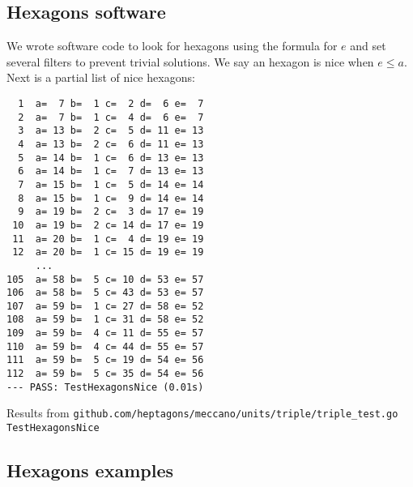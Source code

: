 \documentclass[11pt]{article}
\begin{document}
\subsection{Hexagons software}
We wrote software code to look for hexagons using the formula for $e$ and set several
filters to prevent trivial solutions. We say an hexagon is nice when $e \leq a$.
Next is a partial list of nice hexagons:
\begin{lstlisting}
  1  a=  7 b=  1 c=  2 d=  6 e=  7
  2  a=  7 b=  1 c=  4 d=  6 e=  7
  3  a= 13 b=  2 c=  5 d= 11 e= 13
  4  a= 13 b=  2 c=  6 d= 11 e= 13
  5  a= 14 b=  1 c=  6 d= 13 e= 13
  6  a= 14 b=  1 c=  7 d= 13 e= 13
  7  a= 15 b=  1 c=  5 d= 14 e= 14
  8  a= 15 b=  1 c=  9 d= 14 e= 14
  9  a= 19 b=  2 c=  3 d= 17 e= 19
 10  a= 19 b=  2 c= 14 d= 17 e= 19
 11  a= 20 b=  1 c=  4 d= 19 e= 19
 12  a= 20 b=  1 c= 15 d= 19 e= 19
     ...
105  a= 58 b=  5 c= 10 d= 53 e= 57
106  a= 58 b=  5 c= 43 d= 53 e= 57
107  a= 59 b=  1 c= 27 d= 58 e= 52
108  a= 59 b=  1 c= 31 d= 58 e= 52
109  a= 59 b=  4 c= 11 d= 55 e= 57
110  a= 59 b=  4 c= 44 d= 55 e= 57
111  a= 59 b=  5 c= 19 d= 54 e= 56
112  a= 59 b=  5 c= 35 d= 54 e= 56
--- PASS: TestHexagonsNice (0.01s)
\end{lstlisting}
Results from \texttt{github.com/heptagons/meccano/units/triple/triple\_test.go TestHexagonsNice}

\subsection{Hexagons examples}
\end{document}
